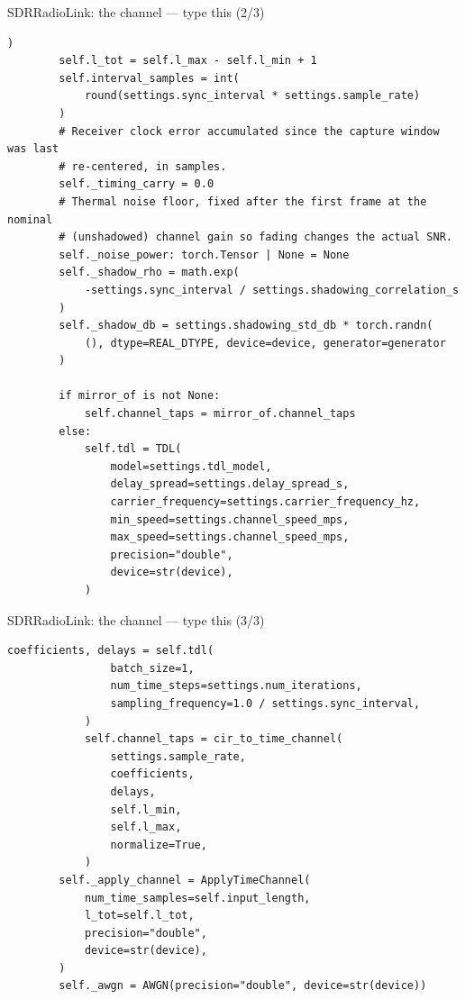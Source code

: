 \documentclass[10pt]{beamer}
\begin{document}
\begin{frame}[fragile]{SDRRadioLink: the channel --- type this (2/3)}
\begin{lstlisting}[basicstyle=\ttfamily\tiny]
        )
        self.l_tot = self.l_max - self.l_min + 1
        self.interval_samples = int(
            round(settings.sync_interval * settings.sample_rate)
        )
        # Receiver clock error accumulated since the capture window was last
        # re-centered, in samples.
        self._timing_carry = 0.0
        # Thermal noise floor, fixed after the first frame at the nominal
        # (unshadowed) channel gain so fading changes the actual SNR.
        self._noise_power: torch.Tensor | None = None
        self._shadow_rho = math.exp(
            -settings.sync_interval / settings.shadowing_correlation_s
        )
        self._shadow_db = settings.shadowing_std_db * torch.randn(
            (), dtype=REAL_DTYPE, device=device, generator=generator
        )

        if mirror_of is not None:
            self.channel_taps = mirror_of.channel_taps
        else:
            self.tdl = TDL(
                model=settings.tdl_model,
                delay_spread=settings.delay_spread_s,
                carrier_frequency=settings.carrier_frequency_hz,
                min_speed=settings.channel_speed_mps,
                max_speed=settings.channel_speed_mps,
                precision="double",
                device=str(device),
            )
\end{lstlisting}
\end{frame}

\begin{frame}[fragile]{SDRRadioLink: the channel --- type this (3/3)}
\begin{lstlisting}[basicstyle=\ttfamily\tiny]
            coefficients, delays = self.tdl(
                batch_size=1,
                num_time_steps=settings.num_iterations,
                sampling_frequency=1.0 / settings.sync_interval,
            )
            self.channel_taps = cir_to_time_channel(
                settings.sample_rate,
                coefficients,
                delays,
                self.l_min,
                self.l_max,
                normalize=True,
            )
        self._apply_channel = ApplyTimeChannel(
            num_time_samples=self.input_length,
            l_tot=self.l_tot,
            precision="double",
            device=str(device),
        )
        self._awgn = AWGN(precision="double", device=str(device))
\end{lstlisting}
\end{frame}
\end{document}
